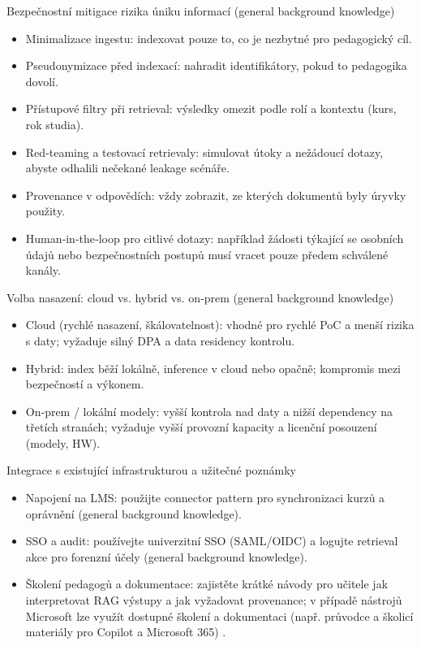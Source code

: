 Bezpečnostní mitigace rizika úniku informací (general background knowledge)
\begin{itemize}
  \item Minimalizace ingestu: indexovat pouze to, co je nezbytné pro pedagogický cíl.
  \item Pseudonymizace před indexací: nahradit identifikátory, pokud to pedagogika dovolí.
  \item Přístupové filtry při retrieval: výsledky omezit podle rolí a kontextu (kurs, rok studia).
  \item Red‑teaming a testovací retrievaly: simulovat útoky a nežádoucí dotazy, abyste odhalili nečekané leakage scénáře.
  \item Provenance v odpovědích: vždy zobrazit, ze kterých dokumentů byly úryvky použity.
  \item Human‑in‑the‑loop pro citlivé dotazy: například žádosti týkající se osobních údajů nebo bezpečnostních postupů musí vracet pouze předem schválené kanály.
\end{itemize}

Volba nasazení: cloud vs. hybrid vs. on‑prem (general background knowledge)
\begin{itemize}
  \item Cloud (rychlé nasazení, škálovatelnost): vhodné pro rychlé PoC a menší rizika s daty; vyžaduje silný DPA a data residency kontrolu.
  \item Hybrid: index běží lokálně, inference v cloud nebo opačně; kompromis mezi bezpečností a výkonem.
  \item On‑prem / lokální modely: vyšší kontrola nad daty a nižší dependency na třetích stranách; vyžaduje vyšší provozní kapacity a licenční posouzení (modely, HW).
\end{itemize}

Integrace s existující infrastrukturou a užitečné poznámky
\begin{itemize}
  \item Napojení na LMS: použijte connector pattern pro synchronizaci kurzů a oprávnění (general background knowledge).
  \item SSO a audit: používejte univerzitní SSO (SAML/OIDC) a logujte retrieval akce pro forenzní účely (general background knowledge).
  \item Školení pedagogů a dokumentace: zajistěte krátké návody pro učitele jak interpretovat RAG výstupy a jak vyžadovat provenance; v případě nástrojů Microsoft lze využít dostupné školení a dokumentaci (např. průvodce a školicí materiály pro Copilot a Microsoft 365) \cite{kb_ai_101_tipu_pdf_04e4a115_page_44_2,kb_ai_101_tipu_pdf_04e4a115_page_8_1}.
\end{itemize}


